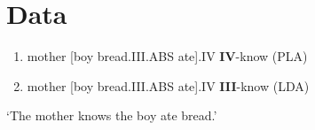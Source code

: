 
\begin{abstract}
\begin{enumerate}
  \item In Tsez, verbs agree with absolutive arguments in noun class.
  \item When the absolutive argument is a clause, and that clause has an absolutive topic (covertly moved at LF), verbs agree with the absolutive topic. If there is no absolutive topic, they agree with the clause itself.
\end{enumerate}
\end{abstract}

\section*{Data}

\begin{enumerate}
  \item mother [boy bread.III.ABS ate].IV \textbf{IV}-know (PLA)
  \item mother [boy bread.III.ABS ate].IV \textbf{III}-know (LDA)
\end{enumerate}
`The mother knows the boy ate bread.'
